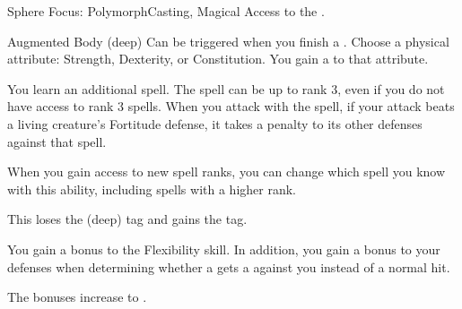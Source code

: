     \begin{magicalfeat}{Sphere Focus: Polymorph}{Casting, Magical}
        \featpre Access to the  .

        \begin{magicalattuneability}{Augmented Body}{ (deep)}
            \abilityusagetime Can be triggered when you finish a .
            \rankline
            Choose a physical attribute: Strength, Dexterity, or Constitution.
            You gain a   to that attribute.
        \end{magicalattuneability}

         You learn an additional spell.
        The spell can be up to rank 3, even if you do not have access to rank 3 spells.
        When you attack with the spell, if your attack beats a living creature's Fortitude defense, it takes a  penalty to its other defenses against that spell.

        When you gain access to new spell ranks, you can change which spell you know with this ability, including spells with a higher rank.

         This loses the  (deep) tag and gains the  tag.

         You gain a  bonus to the Flexibility skill.
        In addition, you gain a  bonus to your defenses when determining whether a  gets a  against you instead of a normal hit.

         The bonuses increase to .
    \end{magicalfeat}

